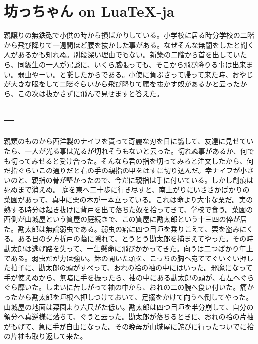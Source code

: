 \documentclass{ltjsarticle}
\begin{document}
\section{坊っちゃん on Lua\TeX-ja}
親譲りの無鉄砲で小供の時から損ばかりしている。小学校に居る時分学校の二階から飛び降りて一週間ほど腰を抜かした事がある。なぜそんな無闇をしたと聞く人があるかも知れぬ。別段深い理由でもない。新築の二階から首を出していたら、同級生の一人が冗談に、いくら威張っても、そこから飛び降りる事は出来まい。弱虫やーい。と囃したからである。小使に負ぶさって帰って来た時、おやじが大きな眼をして二階ぐらいから飛び降りて腰を抜かす奴があるかと云ったから、この次は抜かさずに飛んで見せますと答えた。
\subsection{一}
親類のものから西洋製のナイフを貰って奇麗な刃を日に翳して、友達に見せていたら、一人が光る事は光るが切れそうもないと云った。切れぬ事があるか、何でも切ってみせると受け合った。そんなら君の指を切ってみろと注文したから、何だ指ぐらいこの通りだと右の手の親指の甲をはすに切り込んだ。幸ナイフが小さいのと、親指の骨が堅かったので、今だに親指は手に付いている。しかし創痕は死ぬまで消えぬ。
庭を東へ二十歩に行き尽すと、南上がりにいささかばかりの菜園があって、真中に栗の木が一本立っている。これは命より大事な栗だ。実の熟する時分は起き抜けに背戸を出て落ちた奴を拾ってきて、学校で食う。菜園の西側が山城屋という質屋の庭続きで、この質屋に勘太郎という十三四の倅が居た。勘太郎は無論弱虫である。弱虫の癖に四つ目垣を乗りこえて、栗を盗みにくる。ある日の夕方折戸の蔭に隠れて、とうとう勘太郎を捕まえてやった。その時勘太郎は逃げ路を失って、一生懸命に飛びかかってきた。向うは二つばかり年上である。弱虫だが力は強い。鉢の開いた頭を、こっちの胸へ宛ててぐいぐい押した拍子に、勘太郎の頭がすべって、おれの袷の袖の中にはいった。邪魔になって手が使えぬから、無暗に手を振ったら、袖の中にある勘太郎の頭が、右左へぐらぐら靡いた。しまいに苦しがって袖の中から、おれの二の腕へ食い付いた。痛かったから勘太郎を垣根へ押しつけておいて、足搦をかけて向うへ倒してやった。山城屋の地面は菜園より六尺がた低い。勘太郎は四つ目垣を半分崩して、自分の領分へ真逆様に落ちて、ぐうと云った。勘太郎が落ちるときに、おれの袷の片袖がもげて、急に手が自由になった。その晩母が山城屋に詫びに行ったついでに袷の片袖も取り返して来た。
\end{document}
